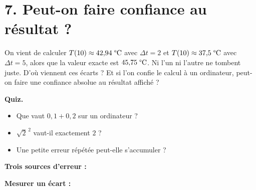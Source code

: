 \section*{7. Peut-on faire confiance au résultat ?}

On vient de calculer $T(10) \approx 42{,}94\;\text{\textdegree C}$ avec
$\Delta t = 2$ et $T(10) \approx 37{,}5\;\text{\textdegree C}$ avec $\Delta t = 5$,
alors que la valeur exacte est $45{,}75\;\text{\textdegree C}$.
Ni l'un ni l'autre ne tombent juste.
D'où viennent ces écarts ?
Et si l'on confie le calcul à un ordinateur,
peut-on faire une confiance absolue au résultat affiché ?

\medskip

\textbf{Quiz.}
\begin{itemize}[leftmargin=*]
  \item Que vaut $0{,}1 + 0{,}2$ sur un ordinateur ?
  \item $\sqrt{2}^{\,2}$ vaut-il exactement $2$ ?
  \item Une petite erreur répétée peut-elle s'accumuler ?
\end{itemize}

\medskip

\textbf{Trois sources d'erreur :}


\textbf{Mesurer un écart :}


